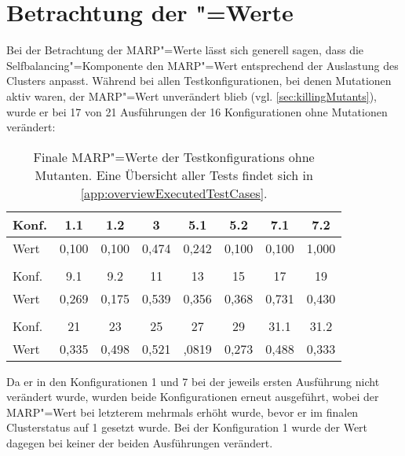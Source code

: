 \section{Betrachtung der "=Werte}
\label{sec:marpValueResults}

Bei der Betrachtung der \gls{MARP}"=Werte lässt sich generell sagen, dass die Selfbalancing"=Komponente den \gls{MARP}"=Wert entsprechend der Auslastung des Clusters anpasst.
Während bei allen Testkonfigurationen, bei denen Mutationen aktiv waren, der \gls{MARP}"=Wert unverändert blieb (vgl. \cref{sec:killingMutants}), wurde er bei 17 von 21 Ausführungen der 16 Konfigurationen ohne Mutationen verändert:

\begin{table}[h]
    \begin{tabular}{l|c|c|c|c|c|c|c}
    	Konf. &  1.1  &  1.2  &   3   &  5.1  &  5.2  &  7.1  &  7.2  \\ \hline
    	Wert  & 0,100 & 0,100 & 0,474 & 0,242 & 0,100 & 0,100 & 1,000 \\
    	\multicolumn{8}{c}{} \\
    	Konf. &  9.1  &  9.2  &  11   &  13   &  15   &  17   &  19   \\ \hline
    	Wert  & 0,269 & 0,175 & 0,539 & 0,356 & 0,368 & 0,731 & 0,430 \\
    	\multicolumn{8}{c}{} \\
    	Konf. &  21   &  23   &  25   &  27   &  29   & 31.1  & 31.2  \\ \hline
    	Wert  & 0,335 & 0,498 & 0,521 & ,0819 & 0,273 & 0,488 & 0,333
    \end{tabular}
    \caption[Finale \acrshort{MARP}"=Werte der \glspl{Testkonfiguration} ohne Mutanten.]
    {Finale \acrshort{MARP}"=Werte der \glspl{Testkonfiguration} ohne Mutanten.
    Eine Übersicht aller Tests findet sich in \cref{app:overviewExecutedTestCases}.}
    \label{tab:finalMarpValues}
\end{table}

Da er in den Konfigurationen 1 und 7 bei der jeweils ersten Ausführung nicht verändert wurde, wurden beide Konfigurationen erneut ausgeführt, wobei der \gls{MARP}"=Wert bei letzterem mehrmals erhöht wurde, bevor er im finalen Clusterstatus auf 1 gesetzt wurde.
Bei der Konfiguration 1 wurde der Wert dagegen bei keiner der beiden Ausführungen verändert.

